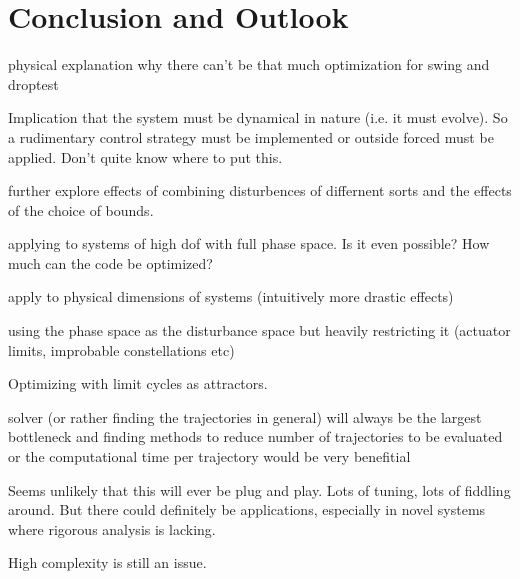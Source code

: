 \chapter{Conclusion and Outlook}


physical explanation why there can't be that much optimization for swing and droptest

Implication that the system must be dynamical in nature (i.e. it must evolve). So a rudimentary control strategy must be implemented or outside forced must be applied. Don't quite know where to put this. 


further explore effects of combining disturbences of differnent sorts and the effects of the choice of bounds.

applying to systems of high dof with full phase space. Is it even possible? How much can the code be optimized?

apply to physical dimensions of systems (intuitively more drastic effects)

using the phase space as the disturbance space but heavily restricting it (actuator limits, improbable constellations etc)

Optimizing with limit cycles as attractors. 

solver (or rather finding the trajectories in general) will always be the largest bottleneck and finding methods to reduce number of trajectories to be evaluated or the computational time per trajectory would be very benefitial


Seems unlikely that this will ever be plug and play. Lots of tuning, lots of fiddling around. But there could definitely be applications, especially in novel systems where rigorous analysis is lacking. 

High complexity is still an issue. 